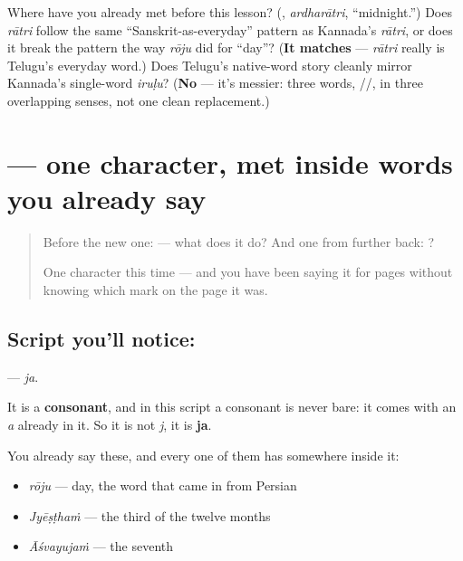 \begin{tcolorbox}[breakable,colback=teal!4,colframe=teal!35!black,title={Before you move on}]
Where have you already met \textbf{} before this lesson? (\textbf{}, \emph{ardharātri}, \textquotedblleft{}midnight.\textquotedblright{}) Does \emph{rātri} follow the same \textquotedblleft{}Sanskrit-as-everyday\textquotedblright{} pattern as Kannada's \emph{rātri}, or does it break the pattern the way \emph{rōju} did for \textquotedblleft{}day\textquotedblright{}? (\textbf{It matches} — \emph{rātri} really is Telugu's everyday word.) Does Telugu's native-word story cleanly mirror Kannada's single-word \emph{iruḷu}? (\textbf{No} — it's messier: three words, \textbf{}/\textbf{}/\textbf{}, in three overlapping senses, not one clean replacement.)
\end{tcolorbox}
\section[\texorpdfstring{\te{జ} (ja)}{జ (ja)}]{ — one character, met inside words you already say}

\label{lesson:TE-S127-letter-ja}



\begin{quote}
Before the new one:  — what does it do? And one from further back: ?

One character this time — and you have been saying it for pages without knowing which mark on the page it was.
\end{quote}

\subsection*{Script you'll notice: }
\textbf{} — \emph{ja}.

It is a \textbf{consonant}, and in this script a consonant is never bare: it comes with an \emph{a} already in it. So it is not \emph{j}, it is \textbf{ja}.

You already say these, and every one of them has  somewhere inside it:

\begin{itemize}
\raggedright
  \item \textbf{} \emph{rōju} — day, the word that came in from Persian
  \item \textbf{} \emph{Jyēṣṭhaṁ} — the third of the twelve months
  \item \textbf{} \emph{Āśvayujaṁ} — the seventh
\end{itemize}

